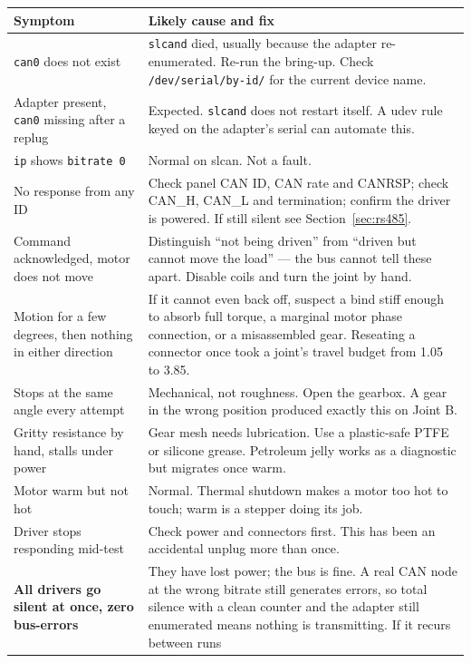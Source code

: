 \documentclass[11pt,letterpaper]{article}
\begin{document}
\begin{longtable}{p{}p{}}
\toprule
\textbf{Symptom} & \textbf{Likely cause and fix} \\ \midrule
\endhead
\texttt{can0} does not exist &
  \texttt{slcand} died, usually because the adapter re-enumerated. Re-run the
  bring-up. Check \texttt{/dev/serial/by-id/} for the current device name. \\
Adapter present, \texttt{can0} missing after a replug &
  Expected. \texttt{slcand} does not restart itself. A udev rule keyed on the
  adapter's serial can automate this. \\
\texttt{ip} shows \texttt{bitrate 0} &
  Normal on slcan. Not a fault. \\
No response from any ID &
  Check panel CAN ID, CAN rate and CANRSP; check CAN\_H, CAN\_L and termination;
  confirm the driver is powered. If still silent see Section~\ref{sec:rs485}. \\
Command acknowledged, motor does not move &
  Distinguish ``not being driven'' from ``driven but cannot move the load'' --- the
  bus cannot tell these apart. Disable coils and turn the joint by hand. \\
Motion for a few degrees, then nothing in either direction &
  If it cannot even back off, suspect a bind stiff enough to absorb full torque, a
  marginal motor phase connection, or a misassembled gear. Reseating a connector
  once took a joint's travel budget from 1.05\textdegree{} to 3.85\textdegree{}. \\
Stops at the same angle every attempt &
  Mechanical, not roughness. Open the gearbox. A gear in the wrong position produced
  exactly this on Joint B. \\
Gritty resistance by hand, stalls under power &
  Gear mesh needs lubrication. Use a plastic-safe PTFE or silicone grease.
  Petroleum jelly works as a diagnostic but migrates once warm. \\
Motor warm but not hot &
  Normal. Thermal shutdown makes a motor too hot to touch; warm is a stepper doing
  its job. \\
Driver stops responding mid-test &
  Check power and connectors first. This has been an accidental unplug more than
  once. \\
\textbf{All drivers go silent at once, zero bus-errors} &
  They have lost power; the bus is fine. A real CAN node at the wrong bitrate
  still generates errors, so total silence with a clean counter and the adapter
  still enumerated means nothing is transmitting. If it recurs between runs

\end{longtable}
\end{document}
